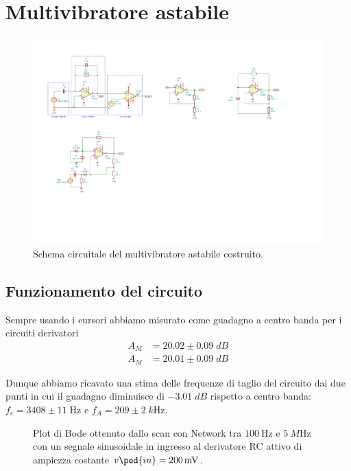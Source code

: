 \documentclass[10pt,a4paper]{article}
\begin{document}
\section{Multivibratore astabile}

\begin{figure}[htbp]
    \centering
	\includegraphics[scale=1.5]{astable}
    \caption{Schema circuitale del multivibratore astabile costruito.
    \label{fig: astableschm}}
\end{figure}

\subsection{Funzionamento del circuito}
Sempre usando i cursori abbiamo misurato come guadagno a centro banda
per i circuiti derivatori
\begin{align*}
A_M &= 20.02 \pm  0.09 \; \si{dB} \\
A_M &= 20.01 \pm  0.09 \; \si{dB}
\end{align*}

Dunque abbiamo ricavato una stima delle frequenze di taglio del circuito dai
due punti in cui il guadagno diminuisce di $-3.01 \; \si{dB}$ rispetto a
centro banda:
$f_c = 3408 \pm 11 \; \si{\Hz}$ e $f_A = 209 \pm 2 \; \si{k\Hz}$.
\begin{figure}[htbp]
\centering
\caption{Plot di Bode ottenuto dallo scan con Network tra $\SI{100}{\Hz}$ e
$\SI{5}{M\Hz}$ con un segnale sinusoidale in ingresso al derivatore RC attivo
di ampiezza costante $v\ped{in} = \SI{200}{m\V}$.
\label{fig: derbode}}
\end{figure}
\end{document}
